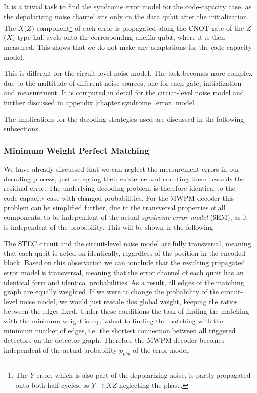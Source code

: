 It is a trivial task to find the syndrome error model for the code-capacity case, as the depolarizing noise channel sits only on the data qubit after the initialization.
The $X$($Z$)-component\footnote{
    The $Y$-error, which is also part of the depolarizing noise, is partly propagated onto both half-cycles, as $Y\rightarrow XZ$ neglecting the phase. 
} of each error is propagated along the CNOT gate of the $Z$($X$)-type half-cycle onto the corresponding ancilla qubit, where it is then measured.
This shows that we do not make any adaptations for the code-capacity model.

This is different for the circuit-level noise model.
The task becomes more complex due to the multitude of different noise sources, one for each gate, initialization and measurement.
It is computed in detail for the circuit-level noise model and further discussed in appendix \ref{chapter:syndrome_error_model}.

The implications for the decoding strategies used are discussed in the following subsections. 

\subsubsection{Minimum Weight Perfect Matching}\label{sssec:stec_decoder_adaption_MWPM}

We have already discussed that we can neglect the measurement errors in our decoding process, just accepting their existence and counting them towards the residual error.
The underlying decoding problem is therefore identical to the code-capacity case with changed probabilities.
For the MWPM decoder this problem can be simplified further, due to the transversal properties of all components, 
to be independent of the actual \emph{syndrome error model} (SEM), as it is independent of the probability. 
This will be shown in the following.

The STEC circuit and the circuit-level noise model are fully transversal, 
meaning that each qubit is acted on identically, regardless of the position in the encoded block.
Based on this observation we can conclude that the resulting propagated error model is transversal, 
meaning that the error channel of each qubit has an identical form and identical probabilities.
As a result, all edges of the matching graph are equally weighted.
If we were to change the probability of the circuit-level noise model, we would just rescale this global weight, keeping the ratios between the edges fixed.
Under these conditions the task of finding the matching with the minimum weight 
is equivalent to finding the matching with the minimum number of edges,
i.e. the shortest connection between all triggered detectors on the detector graph.
Therefore the MWPM decoder becomes independent of the actual probability $p_{phy}$ of the error model.

